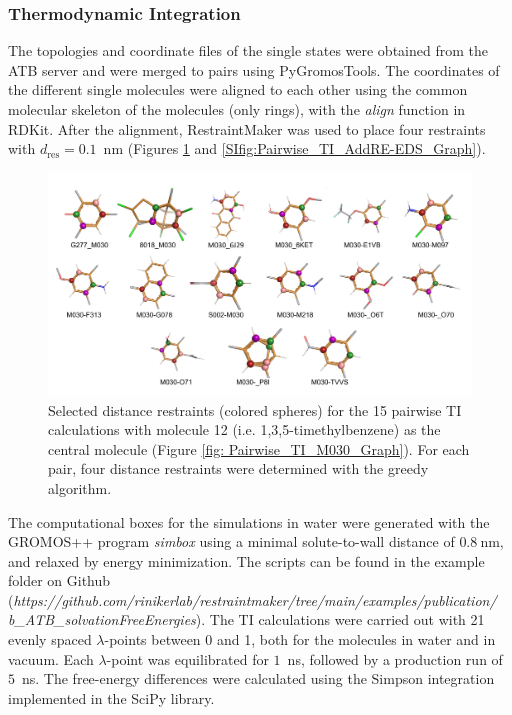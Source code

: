 \subsubsection{Thermodynamic Integration}
The topologies and coordinate files of the single states were obtained from the ATB server\cite{Stroet2018} and were merged to pairs using PyGromosTools\cite{Lehner2021}. 
The coordinates of the different single molecules were aligned to each other using the common molecular skeleton of the molecules (only rings), with the \textit{align} function in RDKit\cite{Landrum2021}. After the alignment, RestraintMaker was used to place four restraints with $d_\text{res} = 0.1$~nm (Figures \ref{SIfig: Pairwise_TI_M030_Graph} and \ref{SIfig:Pairwise_TI_AddRE-EDS_Graph}). 

\begin{figure}[H]
    \centering
    \includegraphics[width=\textwidth]{fig/results/pairwise/restraintPlacement/Restraints_PairwiseTI_M030Graph.png}
    \caption{Selected distance restraints (colored spheres) for the 15 pairwise TI calculations with molecule 12 (i.e. 1,3,5-timethylbenzene) as the central molecule (Figure \ref{fig: Pairwise_TI_M030_Graph}). For each pair, four distance restraints were determined with the greedy algorithm.}
    \label{SIfig: Pairwise_TI_M030_Graph}
\end{figure}


The computational boxes for the simulations in water were generated with the GROMOS++ \cite{Eichenberger2011} program \textit{simbox} using a minimal solute-to-wall distance of $0.8~$nm, and relaxed by energy minimization. The scripts can be found in the example folder on Github (\textit{https://github.com/rinikerlab/restraintmaker/tree/main/examples/publication/\\b\_ATB\_solvationFreeEnergies}).
The TI calculations were carried out with 21 evenly spaced $\lambda$-points between 0 and 1, both for the molecules in water and in vacuum. Each $\lambda$-point was equilibrated for $1$~ns, followed by a production run of $5$~ns. The free-energy differences were calculated using the Simpson integration implemented in the SciPy library.\cite{Virtanen2020}


